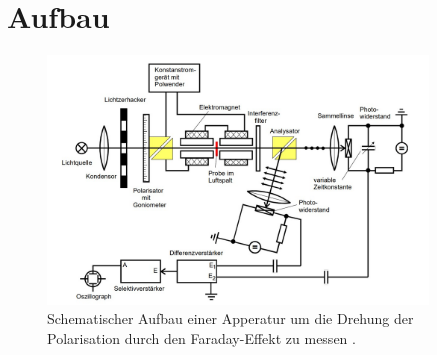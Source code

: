 \section{Aufbau}

\begin{figure}
    \centering
    \includegraphics[width=0.9\textwidth]{bilder/Aufbau.png}
    \caption{Schematischer Aufbau einer Apperatur um die Drehung der Polarisation durch den Faraday-Effekt zu messen \cite{skript}.}
    \label{fig:aufbau}
\end{figure}

